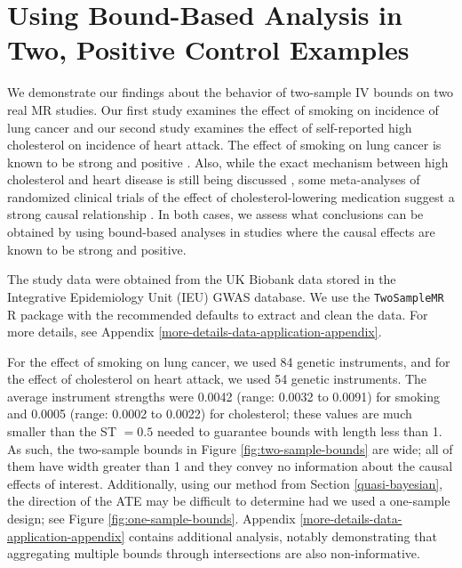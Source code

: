 \documentclass[AMA,STIX1COL,]{WileyNJD-v2}
\begin{document}
\hypertarget{using-bound-based-analysis-in-two-positive-control-examples}{%
\section{Using Bound-Based Analysis in Two, Positive Control
Examples}\label{using-bound-based-analysis-in-two-positive-control-examples}}

\label{data-analysis}

We demonstrate our findings about the behavior of two-sample IV bounds
on two real MR studies. Our first study examines the effect of smoking
on incidence of lung cancer and our second study examines the effect of
self-reported high cholesterol on incidence of heart attack. The effect
of smoking on lung cancer is known to be strong and positive
\citep{united1964smoking}. Also, while the exact mechanism between high
cholesterol and heart disease is still being discussed
\citep{holmes_mendelian_2015, richardson_evaluating_2020}, some
meta-analyses of randomized clinical trials of the effect of
cholesterol-lowering medication suggest a strong causal relationship
\citep{20051267, cholesterol_treatment_trialists_ctt_collaborators_effects_2012}.
In both cases, we assess what conclusions can be obtained by using
bound-based analyses in studies where the causal effects are known to be
strong and positive.

The study data were obtained from the UK Biobank data stored in the
Integrative Epidemiology Unit (IEU) GWAS database. We use the
\texttt{TwoSampleMR} R package \citep{mrbase} with the recommended
defaults to extract and clean the data. For more details, see Appendix
\ref{more-details-data-application-appendix}.

For the effect of smoking on lung cancer, we used 84 genetic
instruments, and for the effect of cholesterol on heart attack, we used
54 genetic instruments. The average instrument strengths were 0.0042
(range: 0.0032 to 0.0091) for smoking and 0.0005 (range: 0.0002 to
0.0022) for cholesterol; these values are much smaller than the ST
\(= 0.5\) needed to guarantee bounds with length less than 1. As such,
the two-sample bounds in Figure \ref{fig:two-sample-bounds} are wide;
all of them have width greater than 1 and they convey no information
about the causal effects of interest. Additionally, using our method
from Section \ref{quasi-bayesian}, the direction of the ATE may be
difficult to determine had we used a one-sample design; see Figure
\ref{fig:one-sample-bounds}. Appendix
\ref{more-details-data-application-appendix} contains additional
analysis, notably demonstrating that aggregating multiple bounds through
intersections are also non-informative.
\end{document}

